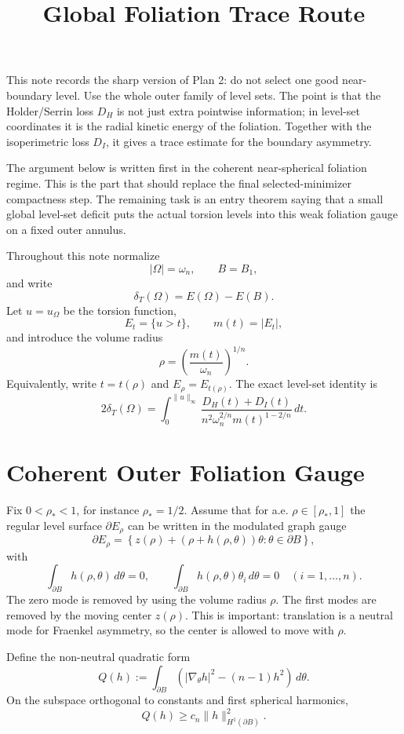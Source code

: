 \documentclass[11pt]{article}
\title{Global Foliation Trace Route}
\author{}
\date{}
\begin{document}
\maketitle

This note records the sharp version of Plan 2: do not select one good
near-boundary level. Use the whole outer family of level sets. The point is
that the Holder/Serrin loss \(D_H\) is not just extra pointwise information; in
level-set coordinates it is the radial kinetic energy of the foliation.
Together with the isoperimetric loss \(D_I\), it gives a trace estimate for the
boundary asymmetry.

The argument below is written first in the coherent near-spherical foliation
regime. This is the part that should replace the final selected-minimizer
compactness step. The remaining task is an entry theorem saying that a small
global level-set deficit puts the actual torsion levels into this weak
foliation gauge on a fixed outer annulus.

Throughout this note normalize
\[
|\Omega|=\omega_n,\qquad B=B_1,
\]
and write
\[
\delta_T(\Omega)=E(\Omega)-E(B).
\]
Let \(u=u_\Omega\) be the torsion function,
\[
E_t=\{u>t\},\qquad m(t)=|E_t|,
\]
and introduce the volume radius
\[
\rho=\left(\frac{m(t)}{\omega_n}\right)^{1/n}.
\]
Equivalently, write \(t=t(\rho)\) and \(E_\rho=E_{t(\rho)}\). The exact
level-set identity is
\[
2\delta_T(\Omega)
=
\int_0^{\|u\|_\infty}
\frac{D_H(t)+D_I(t)}
{n^2\omega_n^{2/n}m(t)^{1-2/n}}\,dt.
\]

\section{Coherent Outer Foliation Gauge}

Fix \(0<\rho_*<1\), for instance \(\rho_*=1/2\). Assume that for a.e.
\(\rho\in[\rho_*,1]\) the regular level surface \(\partial E_\rho\) can be
written in the modulated graph gauge
\[
\partial E_\rho
=
\left\{
z(\rho)+(\rho+h(\rho,\theta))\theta:
\theta\in\partial B
\right\},
\]
with
\[
\int_{\partial B} h(\rho,\theta)\,d\theta=0,
\qquad
\int_{\partial B} h(\rho,\theta)\theta_i\,d\theta=0
\quad(i=1,\ldots,n).
\]
The zero mode is removed by using the volume radius \(\rho\). The first modes
are removed by the moving center \(z(\rho)\). This is important: translation is
a neutral mode for Fraenkel asymmetry, so the center is allowed to move with
\(\rho\).

Define the non-neutral quadratic form
\[
Q(h)
:=
\int_{\partial B}
\left(|\nabla_\theta h|^2-(n-1)h^2\right)\,d\theta.
\]
On the subspace orthogonal to constants and first spherical harmonics,
\[
Q(h)\ge c_n\|h\|_{H^1(\partial B)}^2.
\]
\end{document}
